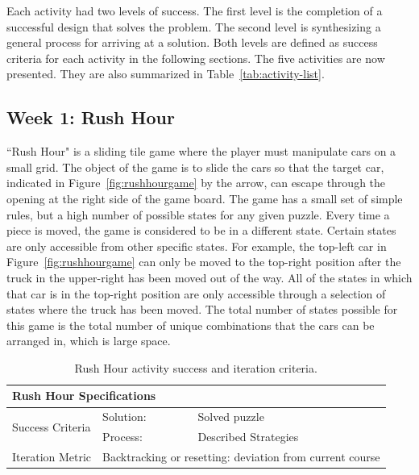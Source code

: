  
 \label{sec:success-levels}
Each activity had two levels of success. The first level is the completion of a successful design that solves the problem. The second level is synthesizing a general process for arriving at a solution. Both levels are defined as success criteria for each activity in the following sections. The five activities are now presented. They are also summarized in Table~\ref{tab:activity-list}.

\subsection{Week 1: Rush Hour}
	
	``Rush Hour" is a sliding tile game where the player must manipulate cars on a small grid. The object of the game is to slide the cars so that the target car, indicated in Figure~\ref{fig:rushhourgame} by the arrow,  can escape through the opening at the right side of the game board.  The game has a small set of simple rules, but a high number of possible states for any given puzzle. Every time a piece is moved, the game is considered to be in a different state. Certain states are only accessible from other specific states. For example, the top-left car in Figure~\ref{fig:rushhourgame} can only be moved to the top-right position after the truck in the upper-right has been moved out of the way. All of the states in which that car is in the top-right position are only accessible through a selection of states where the truck has been moved. The total number of states possible for this game is the total number of unique combinations that the cars can be arranged in, which is large space.
	
		\begin{table}
	\begin{centering}
	\begin{tabular}{l  l   l}
		\multicolumn{3}{l}{{\large Rush Hour Specifications}} \\
		\toprule
		\multirow{2}{*}{Success Criteria}  
			& Solution: 		& Solved puzzle \\ \cmidrule(r){2-3}
			& Process:		& Described Strategies \\ \midrule
		Iteration Metric	 & \multicolumn{2}{c}{Backtracking or resetting: deviation from current course }\\ 
		\bottomrule
	\end{tabular}
	\caption{Rush Hour activity success and iteration criteria.}
	\label{tab:spec-rush-hour}
	\end{centering}
	\end{table}
	
